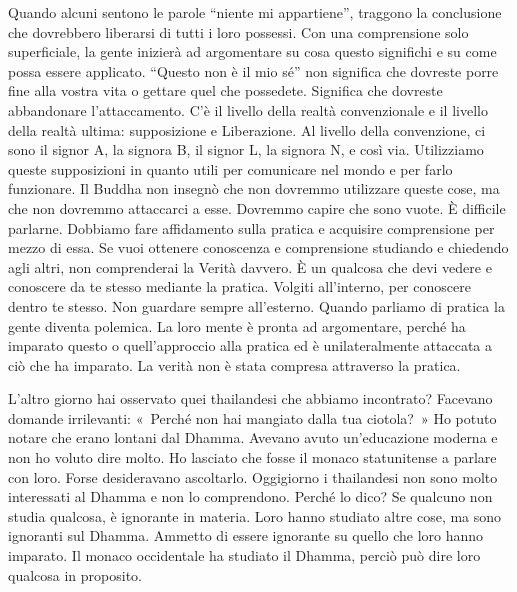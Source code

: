 Quando alcuni sentono le parole ``niente mi appartiene'', traggono la
conclusione che dovrebbero liberarsi di tutti i loro possessi. Con una
comprensione solo superficiale, la gente inizierà ad argomentare su cosa
questo significhi e su come possa essere applicato. ``Questo non è il
mio sé'' non significa che dovreste porre fine alla vostra vita o
gettare quel che possedete. Significa che dovreste abbandonare
l'attaccamento. C'è il livello della realtà convenzionale e il livello
della realtà ultima: supposizione e Liberazione. Al livello della
convenzione, ci sono il signor A, la signora B, il signor L, la signora
N, e così via. Utilizziamo queste supposizioni in quanto utili per
comunicare nel mondo e per farlo funzionare. Il Buddha non insegnò che
non dovremmo utilizzare queste cose, ma che non dovremmo attaccarci a
esse. Dovremmo capire che sono vuote. È difficile parlarne. Dobbiamo
fare affidamento sulla pratica e acquisire comprensione per mezzo di
essa. Se vuoi ottenere conoscenza e comprensione studiando e chiedendo
agli altri, non comprenderai la Verità davvero. È un qualcosa che devi
vedere e conoscere da te stesso mediante la pratica. Volgiti
all'interno, per conoscere dentro te stesso. Non guardare sempre
all'esterno. Quando parliamo di pratica la gente diventa polemica. La
loro mente è pronta ad argomentare, perché ha imparato questo o
quell'approccio alla pratica ed è unilateralmente attaccata a ciò che ha
imparato. La verità non è stata compresa attraverso la pratica.

L'altro giorno hai osservato quei thailandesi che abbiamo incontrato?
Facevano domande irrilevanti: «~Perché non hai mangiato dalla tua
ciotola?~» Ho potuto notare che erano lontani dal Dhamma. Avevano avuto
un'educazione moderna e non ho voluto dire molto. Ho lasciato che fosse
il monaco statunitense a parlare con loro. Forse desideravano
ascoltarlo. Oggigiorno i thailandesi non sono molto interessati al
Dhamma e non lo comprendono. Perché lo dico? Se qualcuno non studia
qualcosa, è ignorante in materia. Loro hanno studiato altre cose, ma
sono ignoranti sul Dhamma. Ammetto di essere ignorante su quello che
loro hanno imparato. Il monaco occidentale ha studiato il Dhamma, perciò
può dire loro qualcosa in proposito.

